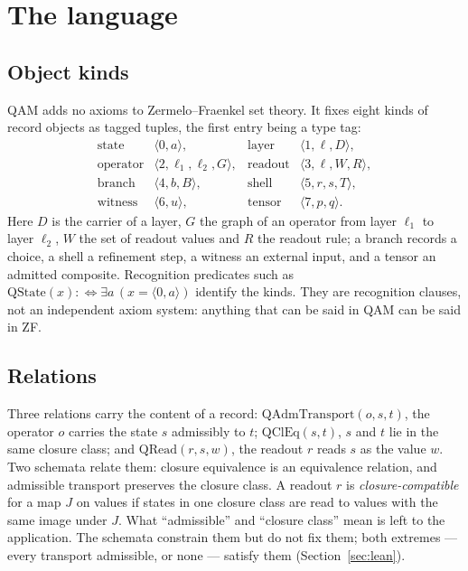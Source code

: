 \section{The language}\label{sec:language}

\subsection{Object kinds}

QAM adds no axioms to Zermelo--Fraenkel set theory.  It fixes eight kinds of record objects as tagged tuples, the first entry being a
type tag:
\[
\begin{array}{llll}
\text{state} & \langle 0,a\rangle, &
\text{layer} & \langle 1,\ell,D\rangle,\\
\text{operator} & \langle 2,\ell_1,\ell_2,G\rangle, &
\text{readout} & \langle 3,\ell,W,R\rangle,\\
\text{branch} & \langle 4,b,B\rangle, &
\text{shell} & \langle 5,r,s,T\rangle,\\
\text{witness} & \langle 6,u\rangle, &
\text{tensor} & \langle 7,p,q\rangle .
\end{array}
\]
Here \(D\) is the carrier of a layer, \(G\) the graph of an operator from layer \(\ell_1\) to layer \(\ell_2\), \(W\) the set of readout values and \(R\)
the readout rule; a branch records a choice, a shell a refinement step, a witness an external input, and a tensor an admitted composite.
Recognition predicates such as \(\mathrm{QState}(x):\Leftrightarrow\exists a\,(x=\langle0,a\rangle)\) identify the kinds.  They are recognition
clauses, not an independent axiom system: anything that can be said in QAM can be said in ZF.

\subsection{Relations}

Three relations carry the content of a record: \(\mathrm{QAdmTransport}(o,s,t)\), the operator \(o\) carries the state \(s\) admissibly to
\(t\); \(\mathrm{QClEq}(s,t)\), \(s\) and \(t\) lie in the same closure class; and \(\mathrm{QRead}(r,s,w)\), the readout \(r\) reads \(s\) as the value \(w\).
Two schemata relate them: closure equivalence is an equivalence relation, and admissible transport preserves the closure class.  A readout
\(r\) is \emph{closure-compatible} for a map \(J\) on values if states in one closure class are read to values with the same image under \(J\).
What ``admissible'' and ``closure class'' mean is left to the application.  The schemata constrain them but do not fix them; both extremes ---
every transport admissible, or none --- satisfy them (Section~\ref{sec:lean}).

